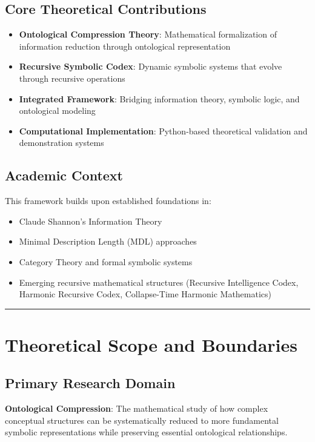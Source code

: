 \subsection{Core Theoretical Contributions}
\begin{itemize}
\item \textbf{Ontological Compression Theory}: Mathematical formalization of information reduction through ontological representation
\item \textbf{Recursive Symbolic Codex}: Dynamic symbolic systems that evolve through recursive operations
\item \textbf{Integrated Framework}: Bridging information theory, symbolic logic, and ontological modeling
\item \textbf{Computational Implementation}: Python-based theoretical validation and demonstration systems
\end{itemize}

\subsection{Academic Context}
This framework builds upon established foundations in:
\begin{itemize}
\item Claude Shannon's Information Theory
\item Minimal Description Length (MDL) approaches
\item Category Theory and formal symbolic systems
\item Emerging recursive mathematical structures (Recursive Intelligence Codex, Harmonic Recursive Codex, Collapse-Time Harmonic Mathematics)
\end{itemize}

\hrule

\section{Theoretical Scope and Boundaries}

\subsection{Primary Research Domain}
\textbf{Ontological Compression}: The mathematical study of how complex conceptual structures can be systematically reduced to more fundamental symbolic representations while preserving essential ontological relationships.

